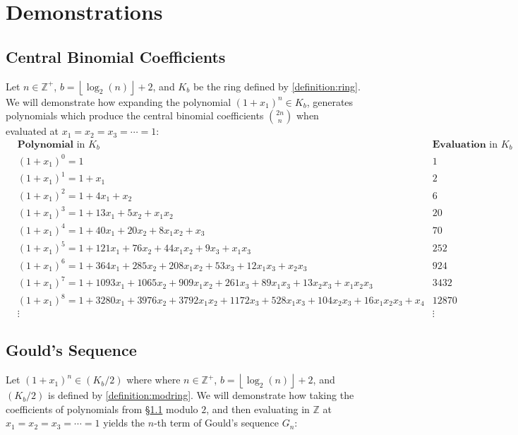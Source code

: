 \documentclass{article}
\theoremstyle{plain}
\theoremstyle{definition}
\newcommand{\floor}[1]{\left\lfloor #1 \right\rfloor}
\newcommand{\Z}{\mathbb{Z}}
\newcommand{\K}{K}
\begin{document}
\section{Demonstrations}

\subsection{Central Binomial Coefficients} \label{section:demonstrations:cbc}
Let $n \in \Z^+$, $b={\floor{\log_2(n)}+2}$, and $\K_b$ be the ring defined by \cref{definition:ring}. We will demonstrate how expanding the polynomial $(1+x_1)^n \in \K_b$, generates polynomials which produce the central binomial coefficients $\binom{2n}{n}$ when evaluated at $x_1=x_2=x_3=\cdots=1$:
\small
\begin{align*}
& \textbf{Polynomial} \text{ in } \K_b & \textbf{Evaluation} \text{ in } \K_b \\ 
& (1+x_1)^0 = 1 & 1 \\
& (1+x_1)^1 = 1+x_1 & 2 \\
& (1+x_1)^2 = 1+4x_1+x_2 & 6 \\
& (1+x_1)^3 = 1+13x_1+5x_2+x_1x_2 & 20 \\
& (1+x_1)^4 = 1+40x_1+20x_2+8x_1x_2+x_3 & 70 \\
& (1+x_1)^5 = 1+121x_1+76x_2+44x_1x_2+9x_3+x_1x_3 & 252 \\
& (1+x_1)^6 = 1+364x_1+285x_2+208x_1x_2+53x_3+12x_1x_3+x_2x_3 & 924 \\
& (1+x_1)^7 = 1+1093x_1+1065x_2+909x_1x_2+261x_3+89x_1x_3+13x_2x_3+x_1x_2x_3 & 3432 \\
& (1+x_1)^8 = 1+3280x_1+3976x_2+3792x_1x_2+1172x_3+528x_1x_3+104x_2x_3+16x_1x_2x_3+x_4 & 12870 \\
& \vdots & \vdots
\end{align*}
\normalsize

\subsection{Gould's Sequence} \label{section:demonstrations:goulds}
Let $(1+x_1)^n \in (\K_b/2)$ where where $n \in \Z^+$, $b={\floor{\log_2(n)}+2}$, and $(\K_b/2)$ is defined by \cref{definition:modring}. We will demonstrate how taking the coefficients of polynomials from \S\ref{section:demonstrations:cbc} modulo $2$, and then evaluating in $\Z$ at $x_1=x_2=x_3=\cdots=1$ yields the $n$-th term of Gould's sequence $G_n$:
\end{document}
